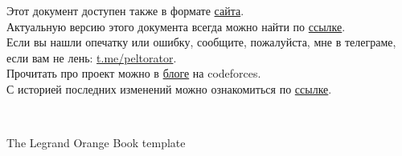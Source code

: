 \documentclass[11pt,fleqn, openany]{book} %
\begin{document}

\begingroup
\thispagestyle{empty} %
\vfill
\endgroup



\newpage


\thispagestyle{empty}
Этот документ доступен также в формате \href{https://peltorator.ru}{сайта}.\\
Актуальную версию этого документа всегда можно найти по \href{https://peltorator.ru/cp_book.pdf}{ссылке}.\\
Если вы нашли опечатку или ошибку, сообщите, пожалуйста, мне в телеграме, если вам не лень: \href{https://t.me/peltorator}{t.me/peltorator}.\\
Прочитать про проект можно в \href{https://codeforces.com/blog/entry/91258}{блоге} на codeforces.\\
С историей последних изменений можно ознакомиться по \href{https://peltorator.ru/cp_book_changes}{ссылке}.

~\vfill


\noindent The Legrand Orange Book template



\usechapterimagefalse %
\end{document}
